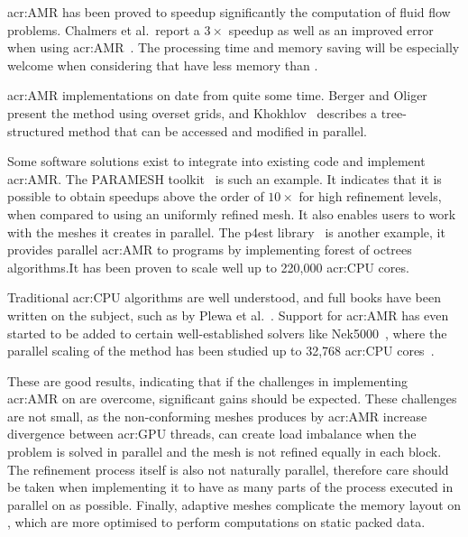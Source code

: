 \Acrshort{acr:AMR} has been proved to speedup significantly the computation of fluid flow problems.
Chalmers et al.\ report a \(3 \times \) speedup as well as an improved error when using
\acrshort{acr:AMR}~\cite{Chalmers2019}. The processing time and memory saving will be especially
welcome when considering that  have less memory than .

\Acrshort{acr:AMR} implementations on  date from quite some time. Berger and
Oliger~\cite{Berger1984} present the method using overset grids, and Khokhlov~\cite{Khokhlov1998}
describes a tree-structured method that can be accessed and modified in parallel.

Some software solutions exist to integrate into existing code and implement \acrlong{acr:AMR}. The
PARAMESH toolkit~\cite{MacNeice2000} is such an example. It indicates that it is possible to obtain
speedups above the order of \( 10 \times \) for high refinement levels, when compared to using an
uniformly refined mesh. It also enables users to work with the meshes it creates in parallel. The
p4est library~\cite{Burstedde2011} is another example, it provides parallel \acrshort{acr:AMR} to
programs by implementing forest of octrees algorithms.It has been proven to scale well up to 220,000
\acrshort{acr:CPU} cores.

Traditional \acrshort{acr:CPU} algorithms are well understood, and full books have been written on
the subject, such as by Plewa et al.~\cite{Plewa2005}. Support for \acrshort{acr:AMR} has even
started to be added to certain well-established solvers like Nek5000~\cite{Offermans2019}, where the
parallel scaling of the method has been studied up to 32,768 \acrshort{acr:CPU}
cores~\cite{Peplinski2016}. 

These are good results, indicating that if the challenges in implementing \acrshort{acr:AMR} on
 are overcome, significant gains should be expected. These challenges are not
small, as the non-conforming meshes produces by \acrshort{acr:AMR} increase divergence between
\acrshort{acr:GPU} threads, can create load imbalance when the problem is solved in parallel and the
mesh is not refined equally in each block. The refinement process itself is also not naturally
parallel, therefore care should be taken when implementing it to have as many parts of the process
executed in parallel on  as possible. Finally, adaptive meshes complicate the
memory layout on , which are more optimised to perform computations on static
packed data.

